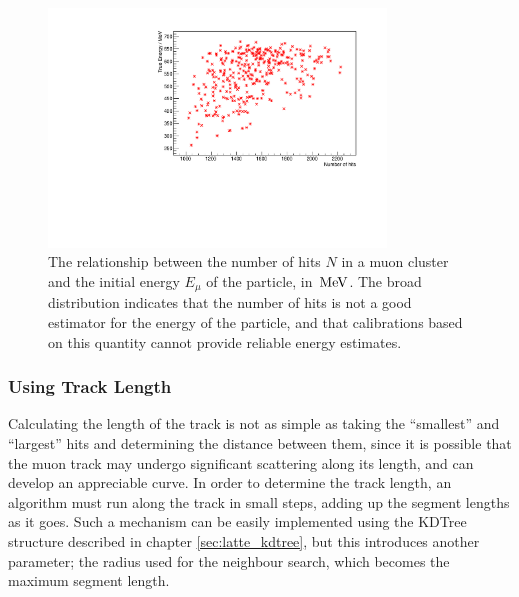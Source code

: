 \begin{figure}
    \centering
    \includegraphics[angle=-90,width=0.8\textwidth]{chapters/analysis_images/ccqe-770-e-nhits-calib}
    \caption[Relationship between number of hits and energy]{\label{fig:ccqe-770-e-nhits-calib}The relationship between the number of hits $N$ in a muon cluster and the initial energy $E_\mu$ of the particle, in $\,\mathrm{MeV}$. The broad distribution indicates that the number of hits is not a good estimator for the energy of the particle, and that calibrations based on this quantity cannot provide reliable energy estimates.}
\end{figure}

\subsubsection{Using Track Length}
Calculating the length of the track is not as simple as taking the ``smallest'' and ``largest'' hits and determining the distance between them, since it is possible that the muon track may undergo significant scattering along its length, and can develop an appreciable curve. In order to determine the track length, an algorithm must run along the track in small steps, adding up the segment lengths as it goes. Such a mechanism can be easily implemented using the \ac{KDTree} structure described in chapter \ref{sec:latte_kdtree}, but this introduces another parameter; the radius used for the neighbour search, which becomes the maximum segment length.

